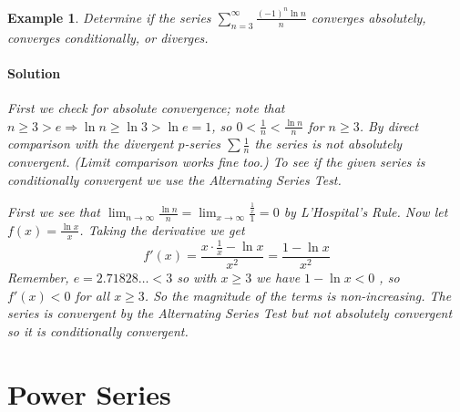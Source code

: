 \documentclass[letterpaper, 11pt, openany]{book}
\theoremstyle{mytheoremstyle}
\theoremstyle{myexamplestyle}
\newtheorem{example}{Example}[section]
\newenvironment{solution}{\paragraph{\sffamily \smaller \fontseries{b}\selectfont Solution}}{\hfill\faSquare}
\begin{document}
\begin{example}\label{e:seriestestslog}
    Determine if the series $\displaystyle \sum_{n=3}^{\infty} \frac{(-1)^{n}\ln n}{n}$ converges absolutely, converges conditionally, or diverges.
    \begin{solution}
        First we check for absolute convergence; note that $n \geq 3 > e \Rightarrow \ln n \geq \ln 3 > \ln e = 1$, so $0 < \frac{1}{n} < \frac{\ln n}{n}$ for $n \geq 3$. By direct comparison with the divergent $p$-series $\sum \frac{1}{n}$ the series is not absolutely convergent. (Limit comparison works fine too.) To see if the given series is conditionally convergent we use the Alternating Series Test.

        First we see that $\displaystyle \lim_{n \to \infty} \frac{\ln n}{n} = \lim_{x \to \infty}\frac{\frac{1}{x}}{1} = 0$ by L'Hospital's Rule. Now let $f(x) = \frac{\ln x}{x}$. Taking the derivative we get
        \[f'(x) = \frac{x\cdot \frac{1}{x} - \ln x}{x^{2}} = \frac{1 - \ln x}{x^{2}}   \]
        Remember, $e = 2.71828\ldots < 3$ so with $x \geq 3$ we have $1 - \ln x < 0$ , so $f'(x) < 0$ for all $x \geq 3$. So the magnitude of the terms is non-increasing. The series is convergent by the Alternating Series Test but not absolutely convergent so it is conditionally convergent.
    \end{solution}
\end{example}

\section{Power Series}
\setcounter{figure}{0}
\end{document}
